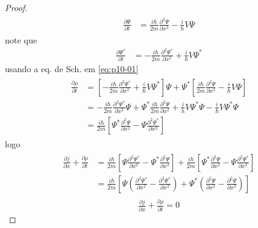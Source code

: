 \begin{prob}
\begin{proof}
\begin{align}
\begin{split}
					\frac{\partial \Psi}{\partial t} &= \frac{i \hbar}{2m}\frac{\partial^{2} \Psi}{\partial x^{2}}-\frac{i}{\hbar}V \Psi 
				\end{split}
		\end{align}
		note que
		\begin{align}
			\frac{\partial \Psi^{*}}{\partial t} &= -\frac{i \hbar}{2m}\frac{\partial^{2} \Psi^{*}}{\partial x^{2}}+\frac{i}{\hbar}V \Psi^{*}
		\end{align}
		usando a eq. de Sch. em \eqref{eq:p10-01}
		\begin{align}
				\begin{split}
					\frac{\partial \rho}{\partial t} &= \left[-\frac{i \hbar}{2m}\frac{\partial^{2} \Psi^{*}}{\partial x^{2}}+\frac{i}{\hbar}V \Psi^{*}\right] \Psi+\Psi^{*}\left[\frac{i \hbar}{2m}\frac{\partial^{2} \Psi}{\partial x^{2}}-\frac{i}{\hbar}V \Psi\right]\\
																					 &= -\frac{i \hbar}{2m}\frac{\partial^{2} \Psi^{*}}{\partial x^{2}} \Psi+\Psi^{*}\frac{i \hbar}{2m}\frac{\partial^{2} \Psi}{\partial x^{2}}+\frac{i}{h}V \Psi^{*} \Psi-\frac{i}{\hbar}V \Psi^{*}\Psi\\
																					 &=\frac{i \hbar}{2m}\left[\Psi^{*}\frac{\partial^{2} \Psi}{\partial x^{2}}-\Psi \frac{\partial^{2} \Psi^{*}}{\partial x^{2}}\right]
				\end{split}
		\end{align}
		logo
		\begin{align}
				\begin{split}
					\frac{\partial j}{\partial x}+\frac{\partial \rho}{\partial t} &= \frac{i \hbar}{2m}\left[\Psi \frac{\partial^{2} \Psi^{*}}{\partial x^{2}}-\Psi^{*}\frac{\partial^{2} \Psi}{\partial x^{2}}\right] + \frac{i \hbar}{2m}\left[\Psi^{*}\frac{\partial^{2} \Psi}{\partial x^{2}}-\Psi \frac{\partial^{2} \Psi^{*}}{\partial x^{2}}\right]\\
																																				 &= \frac{i \hbar}{2m}\left[\Psi \left(\frac{\partial^{2} \Psi^{*}}{\partial x^{2}}-\frac{\partial^{2} \Psi^{*}}{\partial x^{2}}\right)+\Psi^{*}\left(\frac{\partial^{2} \Psi}{\partial x^{2}}-\frac{\partial^{2} \Psi}{\partial x^{2}}\right)\right]
				\end{split}
		\end{align}
		\begin{align}
				\boxed{
					\frac{\partial j}{\partial x}+\frac{\partial \rho}{\partial t} = 0
				}
		\end{align}
			
	\end{proof}
	\end{prob}
